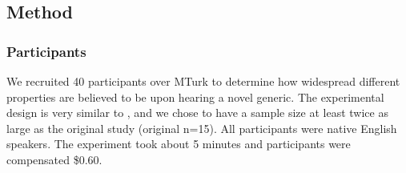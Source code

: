 \documentclass[12pt,letterpaper]{article}
\begin{document}



\subsection*{Method}

\subsubsection*{Participants}

We recruited 40 participants over MTurk to determine how widespread different properties are believed to be upon hearing a novel generic.  
The experimental design is very similar to , and we chose to have a sample size at least twice as large as the original study (original n=15). 
All participants were native English speakers. 
The experiment took about 5 minutes and participants were compensated \$0.60.
\end{document}
